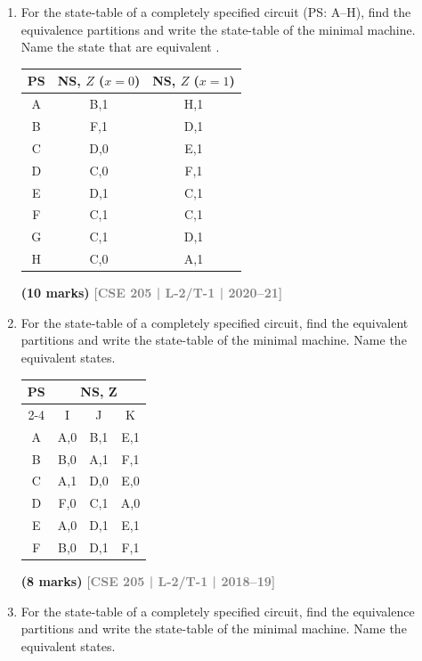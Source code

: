 \documentclass[12pt]{article}
\newcommand{\yr}[1]{\hfill\textcolor{gray}{\small\textbf{[#1]}}}
\newcommand{\mk}[1]{\textcolor{orange!70!black}{\small\textbf{(#1 marks)}}}
\begin{document}
\begin{enumerate}
\mk{11} \yr{CSE 205 | L-2/T-1 | 2022--23}



\item For the state-table of a completely specified circuit (PS: A--H), find the equivalence partitions and write the state-table of the minimal machine. Name the state that are equivalent .
\par\smallskip
\begin{center}
  
\begin{tabular}{c|cc}
\toprule
PS & NS, $Z$ ($x=0$) & NS, $Z$ ($x=1$)\\
\midrule
A & B,1 & H,1 \\ B & F,1 & D,1 \\ C & D,0 & E,1 \\ D & C,0 & F,1 \\
E & D,1 & C,1 \\ F & C,1 & C,1 \\ G & C,1 & D,1 \\ H & C,0 & A,1 \\
\bottomrule
\end{tabular}
\end{center}
\mk{10} \yr{CSE 205 | L-2/T-1 | 2020--21}

\item For the state-table of a completely specified circuit, find the equivalent partitions and write the state-table of the minimal machine. Name the equivalent states.

\begin{center}
  \begin{tabular}{|c|c|c|c|}
\hline
\multirow{2}{*}{PS} & \multicolumn{3}{c|}{NS, Z} \\ \cline{2-4} 
 & I & J & K \\ \hline
A & A,0 & B,1 & E,1 \\ \hline
B & B,0 & A,1 & F,1 \\ \hline
C & A,1 & D,0 & E,0 \\ \hline
D & F,0 & C,1 & A,0 \\ \hline
E & A,0 & D,1 & E,1 \\ \hline
F & B,0 & D,1 & F,1 \\ \hline
\end{tabular}
\end{center}

\mk{8} \yr{CSE 205 | L-2/T-1 | 2018--19}

\item For the state-table of a completely specified circuit, find the equivalence partitions and write the state-table of the minimal machine. Name the equivalent states.


\end{enumerate}
\end{document}
